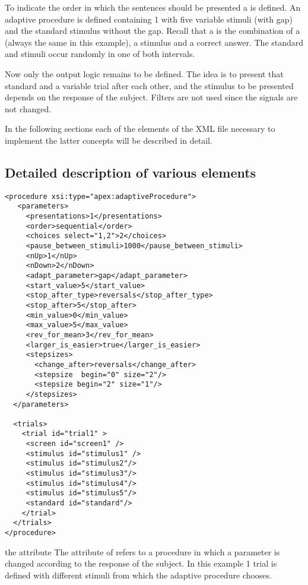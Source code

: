 To indicate the order in which the sentences should be presented a
 is defined. An adaptive procedure is defined
containing 1  with five variable stimuli (with
gap) and the standard stimulus without the gap. Recall that a
 is the combination of a  (always
the same in this example), a stimulus and a correct answer. The
standard and stimuli occur randomly in one of both intervals.

Now only the output logic remains to be defined. The idea is to
present that standard and a variable trial after each other, and
the stimulus to be presented depends on the response of the
subject. Filters are not used since the signals are not changed.

In the following sections each of the elements of the XML file
necessary to implement the latter concepts will be described in
detail.

\subsection{Detailed description of various elements}

\begin{lstlisting}
<procedure xsi:type="apex:adaptiveProcedure">
   <parameters>
     <presentations>1</presentations>
     <order>sequential</order>
     <choices select="1,2">2</choices>
     <pause_between_stimuli>1000</pause_between_stimuli>
     <nUp>1</nUp>
     <nDown>2</nDown>
     <adapt_parameter>gap</adapt_parameter>
     <start_value>5</start_value>
     <stop_after_type>reversals</stop_after_type>
     <stop_after>5</stop_after>
     <min_value>0</min_value>
     <max_value>5</max_value>
     <rev_for_mean>3</rev_for_mean>
     <larger_is_easier>true</larger_is_easier>
     <stepsizes>
       <change_after>reversals</change_after>
       <stepsize  begin="0" size="2"/>
       <stepsize begin="2" size="1"/>
     </stepsizes>
  </parameters>

  <trials>
    <trial id="trial1" >
     <screen id="screen1" />
     <stimulus id="stimulus1" />
     <stimulus id="stimulus2"/>
     <stimulus id="stimulus3"/>
     <stimulus id="stimulus4"/>
     <stimulus id="stimulus5"/>
     <standard id="standard"/>
    </trial>
  </trials>
</procedure>
\end{lstlisting}


 the attribute The attribute
 of 
refers to a procedure in which a parameter is changed according to
the response of the subject. In this example 1 trial is defined
with different stimuli from which the adaptive procedure chooses.

